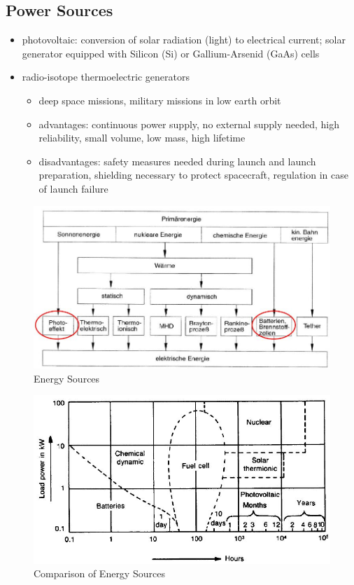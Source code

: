 \subsection{Power Sources}
\begin{itemize}
 \item photovoltaic: conversion of solar radiation (light) to electrical current; solar generator equipped with Silicon (Si) or Gallium-Arsenid (GaAs) cells
 \item radio-isotope thermoelectric generators
 \begin{itemize}
  \item deep space missions, military missions in low earth orbit 
  \item advantages: continuous power supply, no external supply needed, high reliability, small volume, low mass, high lifetime
  \item disadvantages: safety measures needed during launch and launch preparation, shielding necessary to protect spacecraft, regulation in case of launch failure
 \end{itemize}
\end{itemize}
\begin{figure}[!ht]
 \centering
 \includegraphics[scale=0.6]{energysources}
 \caption{Energy Sources}
\end{figure}
\begin{figure}[!ht]
 \centering
 \includegraphics[scale=0.6]{energysourcesComparison}
 \caption{Comparison of Energy Sources}
\end{figure}

